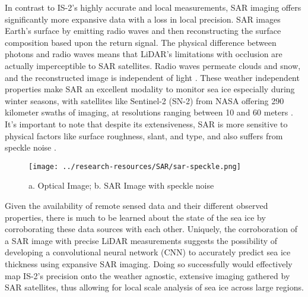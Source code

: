 In contrast to IS-2's highly accurate and local measurements, SAR imaging offers significantly more expansive data with a loss in local precision. SAR images Earth's surface by emitting radio waves and then reconstructing the surface composition based upon the return signal. The physical difference between photons and radio waves means that LiDAR's limitations with occlusion are actually imperceptible to SAR satellites. Radio waves permeate clouds and snow, and the reconstructed image is independent of light \cite{SAR-Info}. These weather independent properties make SAR an excellent modality to monitor sea ice especially during winter seasons, with satellites like Sentinel-2 (SN-2) from NASA offering 290 kilometer swaths of imaging, at resolutions ranging between 10 and 60 meters \cite{Sentinel-2-Availability}. It's important to note that despite its extensiveness, SAR is more sensitive to physical factors like surface roughness, slant, and type, and also suffers from speckle noise \cite{SAR-Info}. 

\begin{figure}[h]
	\centering
	\texttt{[image: ../research-resources/SAR/sar-speckle.png]}
	\caption{a. Optical Image; b. SAR Image with speckle noise}
\end{figure}

\indent Given the availability of remote sensed data and their different observed properties, there is much to be learned about the state of the sea ice by corroborating these data sources with each other. Uniquely, the corroboration of a SAR image with precise LiDAR measurements suggests the possibility of developing a convolutional neural network (CNN) to accurately predict sea ice thickness using expansive SAR imaging. Doing so successfully would effectively map IS-2's precision onto the weather agnostic, extensive imaging gathered by SAR satellites, thus allowing for local scale analysis of sea ice across large regions.


